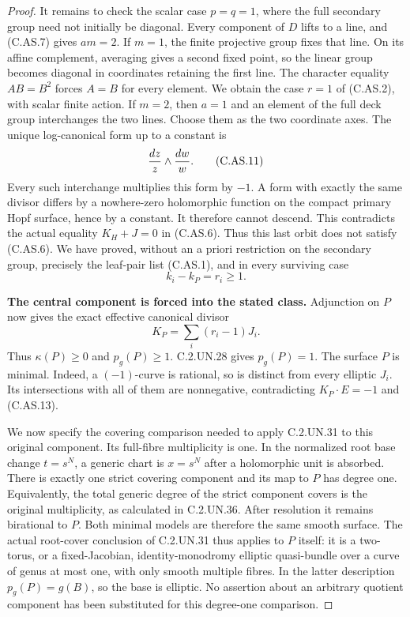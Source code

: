 \begin{proof}
It remains to check the scalar case $p=q=1$,
where the full secondary group need not initially
be diagonal. Every component of $D$ lifts to a
line, and (C.AS.7) gives $am=2$. If $m=1$,
the finite projective group fixes that line.
On its affine complement, averaging gives a
second fixed point, so the linear group becomes
diagonal in coordinates retaining the first line.
The character equality $AB=B^2$ forces $A=B$
for every element. We obtain the case $r=1$
of (C.AS.2), with scalar finite action.
If $m=2$, then $a=1$ and an element of the full
deck group interchanges the two lines. Choose
them as the two coordinate axes. The unique
log-canonical form up to a constant is
\[
                             {dz\over z}\wedge{dw\over w}.
                                                               \tag{C.AS.11}
\]
Every such interchange multiplies this form
by $-1$. A form with exactly the same divisor
differs by a nowhere-zero holomorphic function
on the compact primary Hopf surface, hence by
a constant. It therefore cannot descend.
This contradicts the actual equality
$K_H+J=0$ in (C.AS.6). Thus this last orbit
does not satisfy (C.AS.6). We have proved,
without an a priori restriction on the secondary
group, precisely the leaf-pair list (C.AS.1),
and in every surviving case
\[
                              k_i-k_P=r_i\ge1.          \tag{C.AS.12}
\]

\par\medskip\noindent\textbf{The central component is forced into the stated class.}
Adjunction on $P$ now gives the exact effective
canonical divisor
\[
                         K_P=\sum_i(r_i-1)J_i .         \tag{C.AS.13}
\]
Thus $\kappa(P)\ge0$ and $p_g(P)\ge1$.
C.2.UN.28 gives $p_g(P)=1$. The surface $P$
is minimal. Indeed, a $(-1)$-curve is rational,
so is distinct from every elliptic $J_i$.
Its intersections with all of them are
nonnegative, contradicting $K_P\cdot E=-1$
and (C.AS.13).

We now specify the covering comparison needed
to apply C.2.UN.31 to this original component.
Its full-fibre multiplicity is one. In the
normalized root base change $t=s^N$, a generic
chart is $x=s^N$ after a holomorphic unit is
absorbed. There is exactly one strict covering
component and its map to $P$ has degree one.
Equivalently, the total generic degree of the
strict component covers is the original
multiplicity, as calculated in C.2.UN.36.
After resolution it remains birational to $P$.
Both minimal models are therefore the same
smooth surface. The actual root-cover conclusion
of C.2.UN.31 thus applies to $P$ itself:
it is a two-torus, or a fixed-Jacobian,
identity-monodromy elliptic quasi-bundle over
a curve of genus at most one, with only smooth
multiple fibres. In the latter description
$p_g(P)=g(B)$, so the base is elliptic.
No assertion about an arbitrary quotient
component has been substituted for this
degree-one comparison.


\end{proof}
